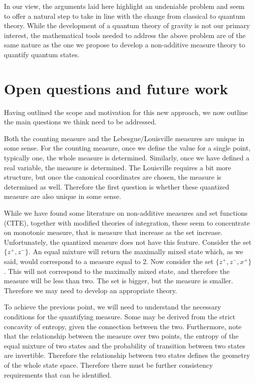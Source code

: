 \documentclass[10pt,twocolumn, nofootinbib]{revtex4-2}
\begin{document}
In our view, the arguments laid here highlight an undeniable problem and seem to offer a natural step to take in line with the change from classical to quantum theory. While the development of a quantum theory of gravity is not our primary interest, the mathematical tools needed to address the above problem are of the same nature as the one we propose to develop a non-additive measure theory to quantify quantum states.

\section{Open questions and future work}

Having outlined the scope and motivation for this new approach, we now outline the main questions we think need to be addressed.

Both the counting measure and the Lebesgue/Louisville measures are unique in some sense. For the counting measure, once we define the value for a single point, typically one, the whole measure is determined. Similarly, once we have defined a real variable, the measure is determined. The Louisville requires a bit more structure, but once the canonical coordinates are chosen, the measure is determined as well. Therefore the first question is whether these quantized measure are also unique in some sense.

While we have found some literature on non-additive measures and set functions (CITE), together with modified theories of integration, these seem to concentrate on monotonic measure, that is measure that increase as the set increase. Unfortunately, the quantized measure does not have this feature. Consider the set $\{ z^+, z^- \}$. An equal mixture will return the maximally mixed state which, as we said, would correspond to a measure equal to 2. Now consider the set $\{ z^+, z^-, x^+ \}$. This will not correspond to the maximally mixed state, and therefore the measure will be less than two. The set is bigger, but the measure is smaller. Therefore we may need to develop an appropriate theory.

To achieve the previous point, we will need to understand the necessary conditions for the quantifying measure. Some may be derived from the strict concavity of entropy, given the connection between the two. Furthermore, note that the relationship between the measure over two points, the entropy of the equal mixture of two states and the probability of transition between two states are invertible. Therefore the relationship between two states defines the geometry of the whole state space. Therefore there must be further consistency requirements that can be identified.
\end{document}
